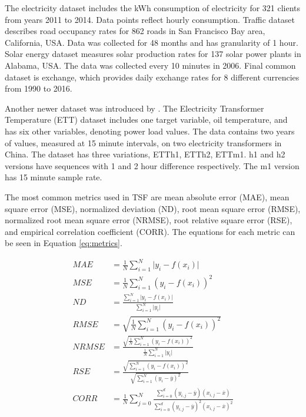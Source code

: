 \documentclass[conference]{IEEEtran}
\begin{document}
The electricity dataset includes the kWh consumption of electricity for 321 clients from years 2011 to 2014.
Data points reflect hourly consumption.
Traffic dataset describes road occupancy rates for 862 roads in San Francisco Bay area, California, USA.
Data was collected for 48 months and has granularity of 1 hour.
Solar energy dataset measures solar production rates for 137 solar power plants in Alabama, USA.
The data was collected every 10 minutes in 2006.
Final common dataset is exchange, which provides daily exchange rates for 8 different currencies from 1990 to 2016.

Another newer dataset was introduced by \cite{zhou2021informer}.
The Electricity Transformer Temperature (ETT) dataset includes one target variable, oil temperature, and has six other variables, denoting power load values.
The data contains two years of values, measured at 15 minute intervals, on two electricity transformers in China.
The dataset has three variations, ETTh1, ETTh2, ETTm1. h1 and h2 versions have sequences with 1 and 2 hour difference respectively. The m1 version has 15 minute sample rate.


The most common metrics used in TSF are mean absolute error (MAE), mean square error (MSE), normalized deviation (ND), root mean square error (RMSE), normalized root mean square error (NRMSE), root relative square error (RSE), and empirical correlation coefficient (CORR). The equations for each metric can be seen in Equation \ref{eq:metrics}.

\begin{equation}
\label{eq:metrics}
\begin{split}
    MAE &= \frac{1}{N}\sum_{i=1}^{N}\lvert y_{i}-f(x_{i})\rvert \\
    MSE &= \frac{1}{N}\sum_{i=1}^{N}(y_{i}-f(x_{i}))^{2} \\
    ND &= \frac{\sum_{i=1}^{N}\lvert y_{i}-f(x_{i})\rvert}{\sum_{i=1}^{N}\lvert y_{i}\rvert} \\
    RMSE &= \sqrt{\frac{1}{N}\sum_{i=1}^{N}(y_{i}-f(x_{i}))^{2}}\\
    NRMSE &= \frac{\sqrt{\frac{1}{N}\sum_{i=1}^{N}(y_{i}-f(x_{i}))^{2}}}{\frac{1}{N}\sum_{i=1}^{N}\lvert y_{i}\rvert} \\
    RSE &= \frac{\sqrt{\sum_{i=1}^{N}(y_{i}-f(x_{i}))^{2}}}{\sqrt{\sum_{i=1}^{N}(y_{i}-\overline{y})^{2}}} \\
    CORR &= \frac{1}{N}\sum_{j=0}^{N}\frac{\sum_{i=0}^{d}(y_{i,j}-\overline{y})(x_{i,j}-\overline{x})}{\sum_{i=0}^{d}(y_{i,j}-\overline{y})^{2}(x_{i,j}-\overline{x})^{2}}
\end{split}
\end{equation}
\end{document}
